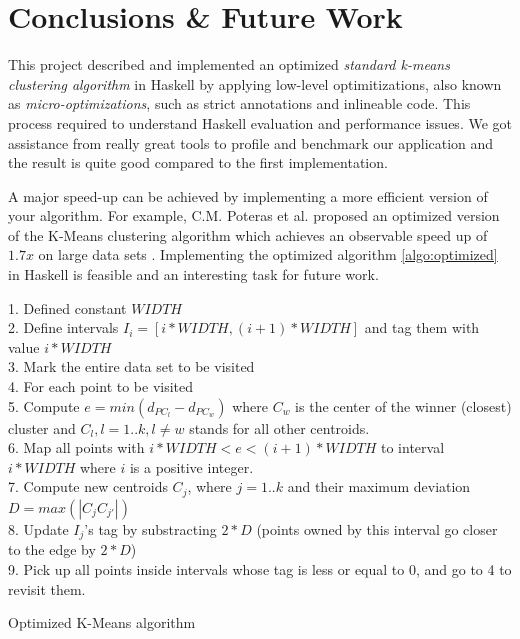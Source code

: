 \documentclass[12pt, a4paper]{article} %
\begin{document}
\section{Conclusions \& Future Work}\label{s:conclusions}

This project described and implemented an optimized \textit{standard k-means clustering algorithm} in Haskell by applying low-level optimitizations, also known as \textit{micro-optimizations}, such as strict annotations and inlineable code. This process required to understand Haskell evaluation and performance issues. We got assistance from really great tools to profile and benchmark our application and the result is quite good compared to the first implementation.

A major speed-up can be achieved by implementing a more efficient version of your algorithm. For example, C.M. Poteras et al. proposed an optimized version of the K-Means clustering algorithm which achieves an observable speed up of $1.7x$ on large data sets \cite{optimized}. Implementing the optimized algorithm \ref{algo:optimized} in Haskell is feasible and an interesting task for future work.

\begin{algorithm}[H]
  1. Defined constant $W\!I\!D\!T\!H$ \\
  2. Define intervals $I_i = [i*W\!I\!D\!T\!H, (i+1)*W\!I\!D\!T\!H]$ and tag them with value $i * W\!I\!D\!T\!H$ \\
  3. Mark the entire data set to be visited \\
  4. For each point to be visited \\
  5. Compute $e = min(d_{PC_l} - d_{PC_w})$ where $C_w$ is the center of the winner (closest) cluster and $C_l, l = 1..k, l \neq w$ stands for all other centroids. \\
  6. Map all points with $i * W\!I\!D\!T\!H < e < (i+1)*W\!I\!D\!T\!H$ to interval $i * W\!I\!D\!T\!H$ where $i$ is a positive integer. \\
  7. Compute new centroids $C_j$, where $j = 1..k$ and their maximum deviation $D = max(|C_jC_{j'}|)$ \\
  8. Update $I_j$'s tag by substracting $2*D$ (points owned by this interval go closer to the edge by $2*D$) \\
  9. Pick up all points inside intervals whose tag is less or equal to 0, and go to 4 to revisit them.
  \caption{Optimized K-Means algorithm}
  \label{algo:optimized}
\end{algorithm}



\end{document}
